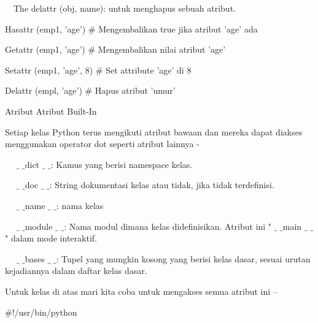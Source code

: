 \documentclass[a4paper,12pt]{report}
\begin{document}
\vspace{12pt}
\noindent 
 $  $ $  $ $  $ $  $The delattr (obj, name): untuk menghapus sebuah atribut. \par
\vspace{12pt}
\noindent 
Hasattr (emp1, 'age')  $  \#  $ Mengembalikan true jika atribut 'age' ada \par
\noindent 
Getattr (emp1, 'age')  $  \#  $ Mengembalikan nilai atribut 'age' \par
\noindent 
Setattr (emp1, 'age', 8)  $  \#  $ Set attribute 'age' di 8 \par
\noindent 
Delattr (empl, 'age')  $  \#  $ Hapus atribut 'umur' \par
\vspace{12pt}
\noindent 
Atribut Atribut Built-In \par
\vspace{12pt}
\noindent 
Setiap kelas Python terus mengikuti atribut bawaan dan mereka dapat diakses menggunakan operator dot seperti atribut lainnya - \par
\vspace{12pt}
\noindent 
 $  $ $  $ $  $ $  $ $  \_  $ $  \_  $dict $  \_  $ $  \_  $: Kamus yang berisi namespace kelas. \par
\vspace{12pt}
\noindent 
 $  $ $  $ $  $ $  $ $  \_  $ $  \_  $doc $  \_  $ $  \_  $: String dokumentasi kelas atau tidak, jika tidak terdefinisi. \par
\vspace{12pt}
\noindent 
 $  $ $  $ $  $ $  $ $  \_  $ $  \_  $name $  \_  $ $  \_  $: nama kelas \par
\vspace{12pt}
\noindent 
 $  $ $  $ $  $ $  $ $  \_  $ $  \_  $module $  \_  $ $  \_  $: Nama modul dimana kelas didefinisikan. Atribut ini " $  \_  $ $  \_  $main $  \_  $ $  \_  $" dalam mode interaktif. \par
\vspace{12pt}
\noindent 
 $  $ $  $ $  $ $  $ $  \_  $ $  \_  $bases $  \_  $ $  \_  $: Tupel yang mungkin kosong yang berisi kelas dasar, sesuai urutan kejadiannya dalam daftar kelas dasar. \par
\vspace{12pt}
\noindent 
Untuk kelas di atas mari kita coba untuk mengakses semua atribut ini – \par
\noindent 
 $  \#  $!/usr/bin/python \par
\vspace{12pt}
\noindent 
\end{document}
